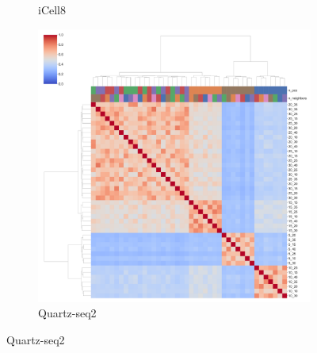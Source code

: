 \documentclass[11pt, titlepage, twoside]{article}
\begin{document}
\begin{figure}[H]
\begin{subfigure}[t]{0.3\textwidth}
        \caption{iCell8} \label{cm_icell8}
    \end{subfigure}
    \hfill
    \begin{subfigure}[t]{0.3\textwidth}
        \centering
        \includegraphics[width=\textwidth]{ClusterMap_L0_Panel2.pdf} 
        \caption{Quartz-seq2} \label{cm_quartz}
    \end{subfigure}


\end{figure}
\end{document}
